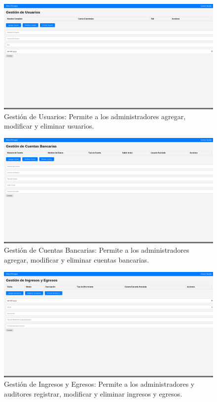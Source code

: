 \documentclass{article}
\begin{document}
\begin{figure}[H]
    \centering
    \includegraphics[width=\textwidth]{img/image3.png}
    \caption{Gestión de Usuarios: Permite a los administradores agregar, modificar y eliminar usuarios.}
\end{figure}

\begin{figure}[H]
    \centering
    \includegraphics[width=\textwidth]{img/image4.png}
    \caption{Gestión de Cuentas Bancarias: Permite a los administradores agregar, modificar y eliminar cuentas bancarias.}
\end{figure}

\begin{figure}[H]
    \centering
    \includegraphics[width=\textwidth]{img/image5.png}
    \caption{Gestión de Ingresos y Egresos: Permite a los administradores y auditores registrar, modificar y eliminar ingresos y egresos.}
\end{figure}
\end{document}
